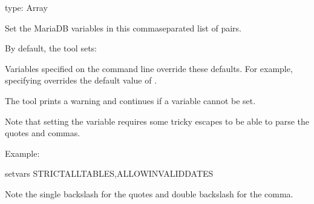 \documentclass[letterpaper,10pt,english]{sphinxmanual}
\begin{document}
\begin{fulllineitems}
\label{\detokenize{mariadb-schema-change:cmdoption-mariadb-schema-change-set-vars}}
type: Array

Set the MariaDB variables in this comma\sphinxhyphen{}separated list of  pairs.

By default, the tool sets:

\begin{sphinxVerbatim}[commandchars=\\\{\}]
\end{sphinxVerbatim}

Variables specified on the command line override these defaults.  For
example, specifying  overrides the default
value of .

The tool prints a warning and continues if a variable cannot be set.

Note that setting the  variable requires some tricky escapes
to be able to parse the quotes and commas.

Example:

\begin{sphinxVerbatim}[commandchars=\\\{\}]
\PYGZhy{}\PYGZhy{}set\PYGZhy{}vars STRICT\PYGZus{}ALL\PYGZus{}TABLES,ALLOW\PYGZus{}INVALID\PYGZus{}DATES
\end{sphinxVerbatim}

Note the single backslash for the quotes and double backslash for the comma.

\end{fulllineitems}

\end{document}
